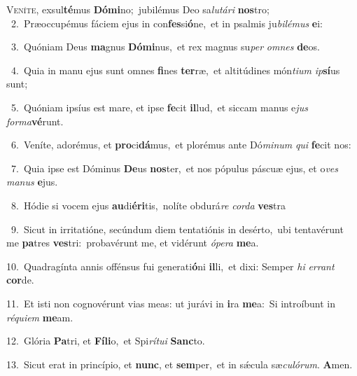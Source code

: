 \lettrine{\initial\textcolor{\initialcolor}{V}}{eníte,} exsul\-\textbf{té}\-mus \textbf{Dó}\-\textbf{mi}no;~\star jubilémus Deo sa\-\textit{lu}\-\textit{tá}\textit{ri} \textbf{nos}\-tro;\\
{\numbfont\textcolor{\numbcolor}{~2.}}~Præoccupémus fáciem ejus in con\-\textbf{fes}\-si\-\textbf{ó}\-ne,~\star et in psalmis ju\-\textit{bi}\-\textit{lé}\textit{mus} \textbf{e}\-i:\par
{\numbfont\textcolor{\numbcolor}{~3.}}~Quóniam Deus \textbf{ma}\-gnus \textbf{Dó}\-\textbf{mi}nus,~\star et rex magnus su\textit{per} \textit{om}\-\textit{nes} \textbf{de}\-os.\par
{\numbfont\textcolor{\numbcolor}{~4.}}~Quia in manu ejus sunt omnes \textbf{fi}\-nes \textbf{ter}\-ræ,~\star et altitúdines món\-\textit{ti}\-\textit{um} \textit{ip}\-\textbf{sí}us sunt;\par
{\numbfont\textcolor{\numbcolor}{~5.}}~Quóniam ipsíus est mare, et ipse \textbf{fe}\-cit \textbf{il}\-lud,~\star et siccam manus e\textit{jus} \textit{for}\-\textit{ma}\textbf{vé}runt.\par
{\numbfont\textcolor{\numbcolor}{~6.}}~Veníte, adorémus, et \textbf{pro}\-ci\-\textbf{dá}\-mus,~\star et plorémus ante Dó\-\textit{mi}\-\textit{num} \textit{qui} \textbf{fe}\-cit nos:\par
{\numbfont\textcolor{\numbcolor}{~7.}}~Quia ipse est Dóminus \textbf{De}\-us \textbf{nos}\-ter,~\star et nos pópulus páscuæ ejus, et o\textit{ves} \textit{ma}\-\textit{nus} \textbf{e}\-jus.\par
{\numbfont\textcolor{\numbcolor}{~8.}}~Hódie si vocem ejus \textbf{au}\-di\-\textbf{é}\-\textbf{ri}tis,~\star nolíte obdurá\textit{re} \textit{cor}\-\textit{da} \textbf{ves}\-tra\par
{\numbfont\textcolor{\numbcolor}{~9.}}~Sicut in irritatióne, secúndum diem tentatiónis in desérto,~\dagger ubi tentavérunt me \textbf{pa}\-tres \textbf{ves}\-tri:~\star probavérunt me, et vidérunt \textit{ó}\-\textit{pe}\textit{ra} \textbf{me}\-a.\par
{\numbfont\textcolor{\numbcolor}{10.}}~Quadragínta annis offénsus fui generati\-\textbf{ó}\-ni \textbf{il}\-li,~\star et dixi: Semper \textit{hi} \textit{er}\-\textit{rant} \textbf{cor}\-de.\par
{\numbfont\textcolor{\numbcolor}{11.}}~Et isti non cognovérunt vias meas: ut jurávi in \textbf{i}\-ra \textbf{me}\-a:~\star Si introíbunt in \textit{ré}\-\textit{qui}\textit{em} \textbf{me}\-am.\par
{\numbfont\textcolor{\numbcolor}{12.}}~Glória \textbf{Pa}\-tri, et \textbf{Fí}\-\textbf{li}o,~\star et Spi\-\textit{rí}\-\textit{tu}\textit{i} \textbf{Sanc}\-to.\par
{\numbfont\textcolor{\numbcolor}{13.}}~Sicut erat in princípio, et \textbf{nunc}\-, et \textbf{sem}\-per,~\star et in sǽcula sæ\-\textit{cu}\-\textit{ló}\textit{rum}. \textbf{A}\-men.\par
